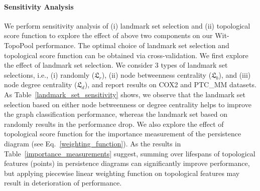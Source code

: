 \documentclass[letterpaper]{article} %
\begin{document}
\begin{table}[h!]
\centering
\setlength{}
\caption{Ablation study of the Wit-TopoPool architecture.\label{ablation_architecture}}
\end{table}

\paragraph{Sensitivity Analysis} We perform sensitivity analysis of (i) landmark set selection and (ii) topological score function to explore the effect of above two components on our Wit-TopoPool performance. The optimal choice of landmark set selection and topological score function can be obtained via cross-validation. We first explore the effect of landmark set selection. We consider 3 types of landmark set selections, i.e., (i) randomly ($\mathfrak{L}_r$), (ii) node betweenness centrality ($\mathfrak{L}_b$), and (iii) node degree centrality ($\mathfrak{L}_d$), and report results on COX2 and PTC\_MM datasets. As Table~\ref{landmark_set_sensitivity} shows, we observe that the landmark set selection based on either node betweenness or degree centrality helps to improve the graph classification performance, whereas the landmark set based on randomly results in the performance drop. We also explore the effect of topological score function for the importance measurement of the persistence diagram (see Eq.~\ref{weighting_function}). As the results in Table~\ref{importance_measurements} suggest, summing over lifespans of topological features (points) in persistence diagrams can significantly improve performance, but applying piecewise linear weighting function on topological features may result in deterioration of performance.  
\end{document}
